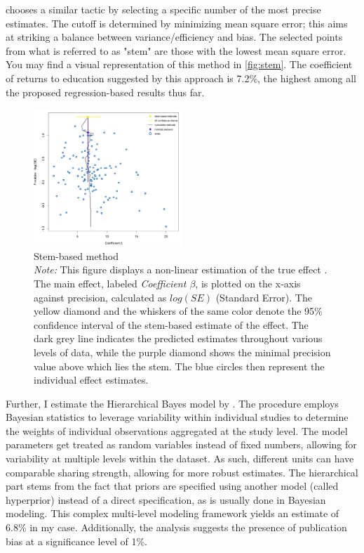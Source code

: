 \cite{Furukawa2019Stem} chooses a similar tactic by selecting a specific number of the most precise estimates. The cutoff is determined by minimizing mean square error; this aims at striking a balance between variance/efficiency and bias. The selected points from what is referred to as "stem" are those with the lowest mean square error. You may find a visual representation of this method in \autoref{fig:stem}. The coefficient of returns to education suggested by this approach is 7.2\%, the highest among all the proposed regression-based results thus far.

\begin{figure}
\centering
\captionsetup{font = scriptsize}
\caption[Stem-based method]{\vspace{0.5cm}Stem-based method\\ \emph{Note:} This figure displays a non-linear estimation of the true effect \citep{Furukawa2019Stem}. The main effect, labeled \textit{Coefficient $\beta$}, is plotted on the x-axis against precision, calculated as $log(SE)$ (Standard Error). The yellow diamond and the whiskers of the same color denote the 95\% confidence interval of the stem-based estimate of the effect. The dark grey line indicates the predicted estimates throughout various levels of data, while the purple diamond shows the minimal precision value above which lies the stem. The blue circles then represent the individual effect estimates.}
\label{fig:stem}
\includegraphics[width=0.5\textwidth]{Figures/stem.png}
\end{figure}

Further, I estimate the Hierarchical Bayes model by \cite{Allenby2006Hier}. The procedure employs Bayesian statistics to leverage variability within individual studies to determine the weights of individual observations aggregated at the study level. The model parameters get treated as random variables instead of fixed numbers, allowing for variability at multiple levels within the dataset. As such, different units can have comparable sharing strength, allowing for more robust estimates. The hierarchical part stems from the fact that priors are specified using another model (called hyperprior) instead of a direct specification, as is usually done in Bayesian modeling. This complex multi-level modeling framework yields an estimate of 6.8\% in my case. Additionally, the analysis suggests the presence of publication bias at a significance level of 1\%.

